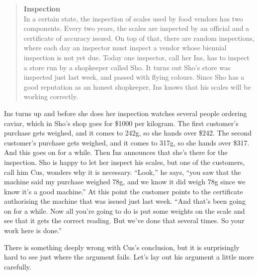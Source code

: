 \begin{quote}
\textbf{Inspection}\\
In a certain state, the inspection of scales used by food vendors has two components. Every two years, the scales are inspected by an official and a certificate of accuracy issued. On top of that, there are random inspections, where each day an inspector must inspect a vendor whose biennial inspection is not yet due. Today one inspector, call her \gls{Ins}, has to inspect a store run by a shopkeeper called \gls{Sho}. It turns out \gls{Sho}'s store was inspected just last week, and passed with flying colours. Since \gls{Sho} has a good reputation as an honest shopkeeper, \gls{Ins} knows that his scales will be working correctly.
\end{quote}
\gls{Ins} turns up and before she does her inspection watches several people ordering caviar, which in \gls{Sho}'s shop goes for \$1000 per kilogram. The first customer's purchase gets weighed, and it comes to 242g, so she hands over \$242. The second customer's purchase gets weighed, and it comes to 317g, so she hands over \$317. And this goes on for a while. Then \gls{Ins} announces that she's there for the inspection. \gls{Sho} is happy to let her inspect his scales, but one of the customers, call him \gls{Cus}, wonders why it is necessary. ``Look,'' he says, ``you saw that the machine said my purchase weighed 78g, and we know it did weigh 78g since we know it's a good machine.'' At this point the customer points to the certificate authorising the machine that was issued just last week. ``And that's been going on for a while. Now all you're going to do is put some weights on the scale and see that it gets the correct reading. But we've done that several times. So your work here is done.''

There is something deeply wrong with \gls{Cus}'s conclusion, but it is surprisingly hard to see just where the argument fails. Let's lay out his argument a little more carefully.


